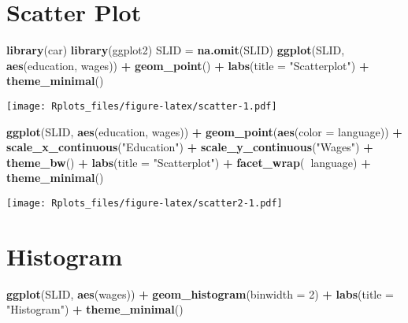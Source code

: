 \documentclass[]{article}
\newenvironment{Shaded}{\begin{snugshade}}{\end{snugshade}}
\newcommand{\KeywordTok}[1]{\textcolor[rgb]{0.13,0.29,0.53}{\textbf{#1}}}
\newcommand{\DataTypeTok}[1]{\textcolor[rgb]{0.13,0.29,0.53}{#1}}
\newcommand{\DecValTok}[1]{\textcolor[rgb]{0.00,0.00,0.81}{#1}}
\newcommand{\StringTok}[1]{\textcolor[rgb]{0.31,0.60,0.02}{#1}}
\newcommand{\OperatorTok}[1]{\textcolor[rgb]{0.81,0.36,0.00}{\textbf{#1}}}
\newcommand{\NormalTok}[1]{#1}
\begin{document}
\section{Scatter Plot}\label{scatter-plot}

\begin{Shaded}
\begin{Highlighting}[]
\KeywordTok{library}\NormalTok{(car)}
\KeywordTok{library}\NormalTok{(ggplot2)}
\NormalTok{SLID =}\StringTok{ }\KeywordTok{na.omit}\NormalTok{(SLID)}
\KeywordTok{ggplot}\NormalTok{(SLID, }\KeywordTok{aes}\NormalTok{(education, wages)) }\OperatorTok{+}\StringTok{ }\KeywordTok{geom_point}\NormalTok{() }\OperatorTok{+}\StringTok{ }\KeywordTok{labs}\NormalTok{(}\DataTypeTok{title =} \StringTok{"Scatterplot"}\NormalTok{) }\OperatorTok{+}\StringTok{ }
\StringTok{    }\KeywordTok{theme_minimal}\NormalTok{()}
\end{Highlighting}
\end{Shaded}

\texttt{[image: Rplots\_files/figure-latex/scatter-1.pdf]}

\begin{Shaded}
\begin{Highlighting}[]
\KeywordTok{ggplot}\NormalTok{(SLID, }\KeywordTok{aes}\NormalTok{(education, wages)) }\OperatorTok{+}\StringTok{ }\KeywordTok{geom_point}\NormalTok{(}\KeywordTok{aes}\NormalTok{(}\DataTypeTok{color =}\NormalTok{ language)) }\OperatorTok{+}\StringTok{ }\KeywordTok{scale_x_continuous}\NormalTok{(}\StringTok{"Education"}\NormalTok{) }\OperatorTok{+}\StringTok{ }
\StringTok{    }\KeywordTok{scale_y_continuous}\NormalTok{(}\StringTok{"Wages"}\NormalTok{) }\OperatorTok{+}\StringTok{ }\KeywordTok{theme_bw}\NormalTok{() }\OperatorTok{+}\StringTok{ }\KeywordTok{labs}\NormalTok{(}\DataTypeTok{title =} \StringTok{"Scatterplot"}\NormalTok{) }\OperatorTok{+}\StringTok{ }
\StringTok{    }\KeywordTok{facet_wrap}\NormalTok{(}\OperatorTok{~}\NormalTok{language) }\OperatorTok{+}\StringTok{ }\KeywordTok{theme_minimal}\NormalTok{()}
\end{Highlighting}
\end{Shaded}

\texttt{[image: Rplots\_files/figure-latex/scatter2-1.pdf]}

\section{Histogram}\label{histogram}

\begin{Shaded}
\begin{Highlighting}[]
\KeywordTok{ggplot}\NormalTok{(SLID, }\KeywordTok{aes}\NormalTok{(wages)) }\OperatorTok{+}\StringTok{ }\KeywordTok{geom_histogram}\NormalTok{(}\DataTypeTok{binwidth =} \DecValTok{2}\NormalTok{) }\OperatorTok{+}\StringTok{ }\KeywordTok{labs}\NormalTok{(}\DataTypeTok{title =} \StringTok{"Histogram"}\NormalTok{) }\OperatorTok{+}\StringTok{ }
\StringTok{    }\KeywordTok{theme_minimal}\NormalTok{()}
\end{Highlighting}
\end{Shaded}
\end{document}

